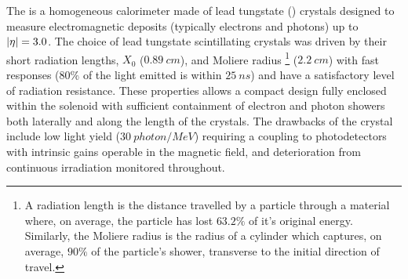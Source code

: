 The \ECAL is a homogeneous calorimeter made of lead tungstate (\pbwo) crystals
designed to measure electromagnetic deposits (typically electrons and photons)
up to ${|\eta|=3.0}$. The choice of lead tungstate scintillating crystals was
driven by their short radiation lengths, $X_0$ (${\SI{0.89}{cm}}$), and
Moliere radius \footnote{A radiation length is the distance travelled by a
particle through a material where, on average, the particle has lost $63.2\%$
of it's original energy. Similarly, the Moliere radius is the radius of a
cylinder which captures, on average, $90\%$ of the particle's shower,
transverse to the initial direction of travel.} (${\SI{2.2}{cm}}$) with fast
responses ($80\%$ of the light emitted is within ${\SI{25}{ns}}$) and have a
satisfactory level of radiation resistance. These properties allows a compact
design fully enclosed within the solenoid with sufficient containment of
electron and photon showers both laterally and along the length of the
crystals. The drawbacks of the crystal include low light yield
(${\SI{30}{photon/MeV}}$) requiring a coupling to photodetectors with
intrinsic gains operable in the magnetic field, and deterioration from
continuous irradiation monitored throughout.

